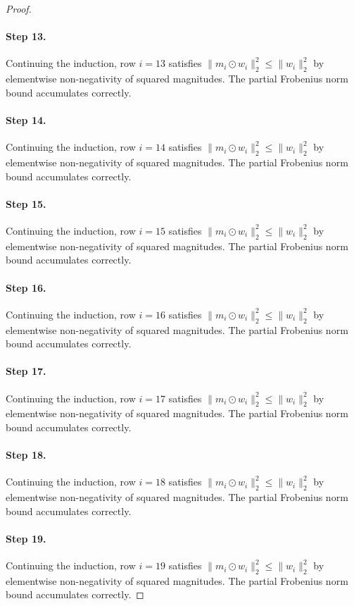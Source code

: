 \begin{proof}
\paragraph{Step 13.}
Continuing the induction, row $i=13$
satisfies $\|m_i \odot w_i\|_2^2 \leq \|w_i\|_2^2$ by elementwise non-negativity
of squared magnitudes.  The partial Frobenius norm bound accumulates correctly.

\paragraph{Step 14.}
Continuing the induction, row $i=14$
satisfies $\|m_i \odot w_i\|_2^2 \leq \|w_i\|_2^2$ by elementwise non-negativity
of squared magnitudes.  The partial Frobenius norm bound accumulates correctly.

\paragraph{Step 15.}
Continuing the induction, row $i=15$
satisfies $\|m_i \odot w_i\|_2^2 \leq \|w_i\|_2^2$ by elementwise non-negativity
of squared magnitudes.  The partial Frobenius norm bound accumulates correctly.

\paragraph{Step 16.}
Continuing the induction, row $i=16$
satisfies $\|m_i \odot w_i\|_2^2 \leq \|w_i\|_2^2$ by elementwise non-negativity
of squared magnitudes.  The partial Frobenius norm bound accumulates correctly.

\paragraph{Step 17.}
Continuing the induction, row $i=17$
satisfies $\|m_i \odot w_i\|_2^2 \leq \|w_i\|_2^2$ by elementwise non-negativity
of squared magnitudes.  The partial Frobenius norm bound accumulates correctly.

\paragraph{Step 18.}
Continuing the induction, row $i=18$
satisfies $\|m_i \odot w_i\|_2^2 \leq \|w_i\|_2^2$ by elementwise non-negativity
of squared magnitudes.  The partial Frobenius norm bound accumulates correctly.

\paragraph{Step 19.}
Continuing the induction, row $i=19$
satisfies $\|m_i \odot w_i\|_2^2 \leq \|w_i\|_2^2$ by elementwise non-negativity
of squared magnitudes.  The partial Frobenius norm bound accumulates correctly.


\end{proof}
